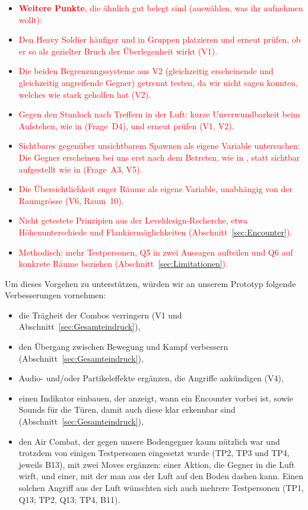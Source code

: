 \documentclass[../Main.tex]{subfiles}
\begin{document}
\begin{itemize}[leftmargin=1.5cm]
    \item \textcolor{red}{\textbf{Weitere Punkte}, die ähnlich gut belegt sind (auswählen, was ihr aufnehmen wollt):}
    \item \textcolor{red}{Den Heavy Soldier häufiger und in Gruppen platzieren und erneut prüfen, ob er so als gezielter Bruch der Überlegenheit wirkt (V1).}
    \item \textcolor{red}{Die beiden Begrenzungssysteme aus V2 (gleichzeitig erscheinende und gleichzeitig angreifende Gegner) getrennt testen, da wir nicht sagen konnten, welches wie stark geholfen hat (V2).}
    \item \textcolor{red}{Gegen den Stunlock nach Treffern in der Luft: kurze Unverwundbarkeit beim Aufstehen, wie in  (Frage~D4), und erneut prüfen (V1, V2).}
    \item \textcolor{red}{Sichtbares gegenüber unsichtbarem Spawnen als eigene Variable untersuchen: Die Gegner erscheinen bei uns erst nach dem Betreten, wie in , statt sichtbar aufgestellt wie in  (Frage~A3, V5).}
    \item \textcolor{red}{Die Übersichtlichkeit enger Räume als eigene Variable, unabhängig von der Raumgrösse (V6, Raum~10).}
    \item \textcolor{red}{Nicht getestete Prinzipien aus der Leveldesign-Recherche, etwa Höhenunterschiede und Flankiermöglichkeiten (Abschnitt~\ref{sec:Encounter}).}
    \item \textcolor{red}{Methodisch: mehr Testpersonen, Q5 in zwei Aussagen aufteilen und Q6 auf konkrete Räume beziehen (Abschnitt~\ref{sec:Limitationen}).}
\end{itemize}

Um dieses Vorgehen zu unterstützen, würden wir an unserem Prototyp folgende Verbesserungen vornehmen:

\begin{itemize}[leftmargin=1.5cm]
    \item die Trägheit der Combos verringern (V1 und Abschnitt~\ref{sec:Gesamteindruck}),
    \item den Übergang zwischen Bewegung und Kampf verbessern (Abschnitt~\ref{sec:Gesamteindruck}),
    \item Audio- und/oder Partikeleffekte ergänzen, die Angriffe ankündigen (V4),
    \item einen Indikator einbauen, der anzeigt, wann ein Encounter vorbei ist, sowie Sounds für die Türen, damit auch diese klar erkennbar sind (Abschnitt~\ref{sec:Gesamteindruck}),
    \item den Air Combat, der gegen unsere Bodengegner kaum nützlich war und trotzdem von einigen Testpersonen eingesetzt wurde (TP2, TP3 und TP4, jeweils B13), mit zwei Moves ergänzen: einer Aktion, die Gegner in die Luft wirft, und einer, mit der man aus der Luft auf den Boden dashen kann. Einen solchen Angriff aus der Luft wünschten sich auch mehrere Testpersonen (TP1, Q13; TP2, Q13; TP4, B11).
\end{itemize}
\end{document}
